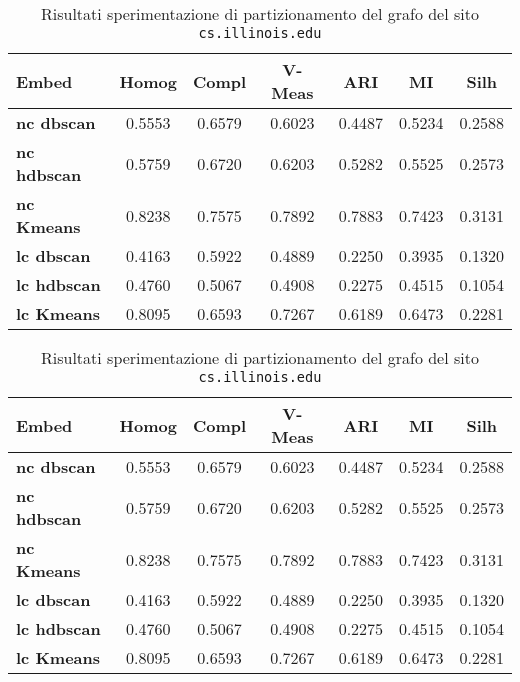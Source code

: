 \begin{table}[H]
	\begin{tabular}{| l | c | c | c | c | c | c |}
	\hline
	\textbf{Embed}  & \textbf{Homog} & \textbf{Compl} & \textbf{V-Meas}  & \textbf{ARI}  & \textbf{MI}  & \textbf{Silh} \\ [3ex] \hline
	\textbf{nc dbscan} & 0.5553 & 0.6579 & 0.6023 & 0.4487 & 0.5234 & 0.2588\\ [3ex]
	 \hline 
	\textbf{nc hdbscan} & 0.5759 & 0.6720 & 0.6203 & 0.5282 & 0.5525 & 0.2573\\ [3ex]
	 \hline
	\textbf{nc Kmeans} & 0.8238 & 0.7575 & 0.7892 & 0.7883 & 0.7423 & 0.3131\\ [3ex]
	 \hline	
	\textbf{lc dbscan} & 0.4163 & 0.5922 & 0.4889 & 0.2250 & 0.3935 & 0.1320\\ [3ex]
	\hline
	\textbf{lc hdbscan} & 0.4760 & 0.5067 & 0.4908 & 0.2275 & 0.4515 & 0.1054\\ [3ex]
	\hline
	
	\textbf{lc Kmeans} & 0.8095 & 0.6593 & 0.7267 & 0.6189 & 0.6473 & 0.2281\\ [3ex]
	\hline
	\end{tabular}
	\caption{Risultati sperimentazione di partizionamento del grafo del sito \texttt{cs.illinois.edu}}
	\label{metricheEmbed}
\end{table}

\begin{table}[H]
	\begin{tabular}{| l | c | c | c | c | c | c |}
	\hline
	\textbf{Embed}  & \textbf{Homog} & \textbf{Compl} & \textbf{V-Meas}  & \textbf{ARI}  & \textbf{MI}  & \textbf{Silh} \\ [3ex] \hline
	\textbf{nc dbscan} & 0.5553 & 0.6579 & 0.6023 & 0.4487 & 0.5234 & 0.2588\\ [3ex]
	 \hline 
	\textbf{nc hdbscan} & 0.5759 & 0.6720 & 0.6203 & 0.5282 & 0.5525 & 0.2573\\ [3ex]
	 \hline
	\textbf{nc Kmeans} & 0.8238 & 0.7575 & 0.7892 & 0.7883 & 0.7423 & 0.3131\\ [3ex]
	 \hline	
	\textbf{lc dbscan} & 0.4163 & 0.5922 & 0.4889 & 0.2250 & 0.3935 & 0.1320\\ [3ex]
	\hline
	\textbf{lc hdbscan} & 0.4760 & 0.5067 & 0.4908 & 0.2275 & 0.4515 & 0.1054\\ [3ex]
	\hline
	
	\textbf{lc Kmeans} & 0.8095 & 0.6593 & 0.7267 & 0.6189 & 0.6473 & 0.2281\\ [3ex]
	\hline
	\end{tabular}
	\caption{Risultati sperimentazione di partizionamento del grafo del sito \texttt{cs.illinois.edu}}
	\label{metricheEmbed}
\end{table}

